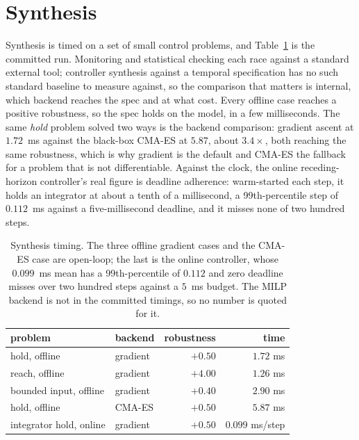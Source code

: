\section{Synthesis}

Synthesis is timed on a set of small control problems, and Table~\ref{tab:synth} is the committed run. Monitoring and statistical checking each race against a standard external tool; controller synthesis against a temporal specification has no such standard baseline to measure against, so the comparison that matters is internal, which backend reaches the spec and at what cost. Every offline case reaches a positive robustness, so the spec holds on the model, in a few milliseconds. The same \emph{hold} problem solved two ways is the backend comparison: gradient ascent at $1.72$~ms against the black-box CMA-ES at $5.87$, about $3.4\times$, both reaching the same robustness, which is why gradient is the default and CMA-ES the fallback for a problem that is not differentiable. Against the clock, the online receding-horizon controller's real figure is deadline adherence: warm-started each step, it holds an integrator at about a tenth of a millisecond, a 99th-percentile step of $0.112$~ms against a five-millisecond deadline, and it misses none of two hundred steps.

\begin{table}[h]
\centering\small
\renewcommand{\arraystretch}{1.25}
\begin{widefig}\begin{tabular}{@{}l l r r@{}}
\toprule
\textbf{problem} & \textbf{backend} & \textbf{robustness} & \textbf{time}\\
\midrule
hold, offline          & gradient & $+0.50$ & $1.72$ ms\\
reach, offline         & gradient & $+4.00$ & $1.26$ ms\\
bounded input, offline & gradient & $+0.40$ & $2.90$ ms\\
hold, offline          & CMA-ES   & $+0.50$ & $5.87$ ms\\
integrator hold, online & gradient & $+0.50$ & $0.099$ ms/step\\
\bottomrule
\end{tabular}\end{widefig}
\caption{Synthesis timing. The three offline gradient cases and the CMA-ES case are open-loop; the last is the online controller, whose $0.099$~ms mean has a 99th-percentile of $0.112$ and zero deadline misses over two hundred steps against a $5$~ms budget. The MILP backend is not in the committed timings, so no number is quoted for it.}
\label{tab:synth}
\end{table}

